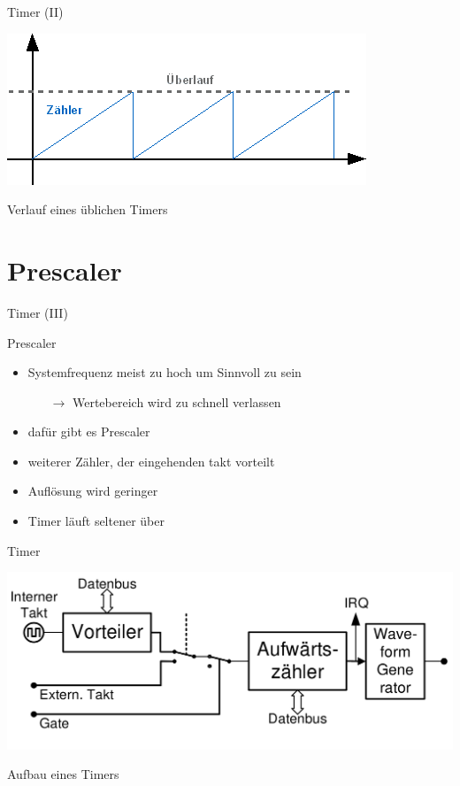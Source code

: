   \begin{frame} {Timer (II)}
    \begin{center}
      \includegraphics[width=.8\textwidth]{figs/kurve_timer}  
    \end{center}
    \begin{block} {}
      Verlauf eines üblichen Timers
    \end{block}
  \end{frame}

  \section{Prescaler}
  \begin{frame}{Timer (III)}
    \begin{block} {Prescaler}
      \begin{itemize}
        \item Systemfrequenz meist zu hoch um Sinnvoll zu sein
        \begin{itemize}
          \item[$\rightarrow$] Wertebereich wird zu schnell verlassen
        \end{itemize} 
        \item dafür gibt es Prescaler
        \item weiterer Zähler, der eingehenden takt \glqq{}vorteilt\grqq{}
        \item Auflösung wird geringer
        \item Timer läuft seltener über
      \end{itemize}
    \end{block}
  \end{frame}

  \begin{frame}{Timer}
    \begin{center}
      \includegraphics[width=\textwidth]{figs/timer_generell}
    \end{center}
    \begin{block} {}
      Aufbau eines Timers
    \end{block}
  \end{frame}

